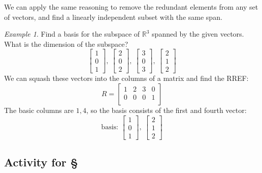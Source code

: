 \documentclass[11pt,oneside]{amsbook}
\newcommand{\R}{\mathbb R}
\theoremstyle{definition}
\theoremstyle{plain}
\theoremstyle{definition}
\theoremstyle{remark}
\newtheorem{example}[theorem]{Example}
\numberwithin{equation}{section}
\numberwithin{figure}{section}
\begin{document}
We can apply the same reasoning to remove the redundant elements from any set of vectors, and find a linearly independent subset with the same span.

\begin{example}
  Find a basis for the subspace of $\R^3$ spanned by the given vectors. What is the dimension of the subspace?
  \[\begin{bmatrix}1\\0\\1\end{bmatrix},\ 
    \begin{bmatrix}2\\0\\2\end{bmatrix},\ 
    \begin{bmatrix}3\\0\\3\end{bmatrix},\ 
    \begin{bmatrix}2\\1\\2\end{bmatrix}
  \]
  We can squash these vectors into the columns of a matrix and find the RREF:
  \[R=\begin{bmatrix}1&2&3&0\\0&0&0&1\\&&&\end{bmatrix}
  \]
  The basic columns are $1,4$, so the basis consists of the first and fourth vector:
  \[\text{basis: }\begin{bmatrix}1\\0\\1\end{bmatrix},\ 
  \begin{bmatrix}2\\1\\2\end{bmatrix}
  \]
\end{example}

\newpage
\subsection*{Activity for \S \thesection}
\end{document}
